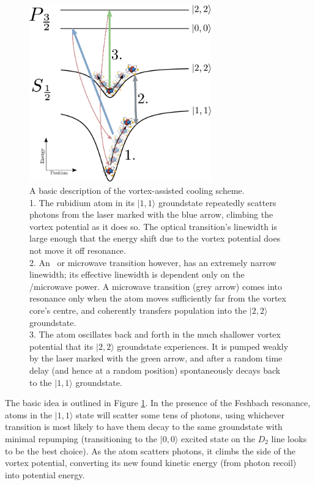 \begin{figure}
\begin{center}
\includegraphics[width=0.7\textwidth]{figures/unsorted/vortexcooling.pdf}
\caption{A basic description of the vortex-assisted cooling scheme.
\protect\\
1. The rubidium atom in its $|1,1\rangle$ groundstate repeatedly scatters photons from the laser marked with the blue arrow, climbing the vortex potential as it does so. The optical transition's linewidth is large enough that the energy shift due to the vortex potential does not move it off resonance.
\protect\\
 2. An \rf\ or microwave transition however, has an extremely narrow linewidth; its effective linewidth is dependent only on the \rf/microwave power. A microwave transition (grey arrow) comes into resonance only when the atom moves sufficiently far from the vortex core's centre, and coherently transfers population into the $|2,2\rangle$ groundstate.
 \protect\\
 3. The atom oscillates back and forth in the much shallower vortex potential that its $|2,2\rangle$ groundstate experiences. It is pumped weakly by the laser marked with the green arrow, and after a random time delay (and hence at a random position) spontaneously decays back to the $|1,1\rangle$ groundstate.
}\label{fig:vortexcooling}
\end{center}
\end{figure}

The basic idea is outlined in Figure \ref{fig:vortexcooling}. In the presence of the Feshbach resonance, atoms in the $|1,1\rangle$ state will scatter some tens of photons, using whichever transition is most likely to have them decay to the same groundstate with minimal repumping (transitioning to the $|0,0\rangle$ excited state on the $D_2$ line looks to be the best choice). As the atom scatters photons, it climbs the side of the vortex potential, converting its new found kinetic energy (from photon recoil) into potential energy.

